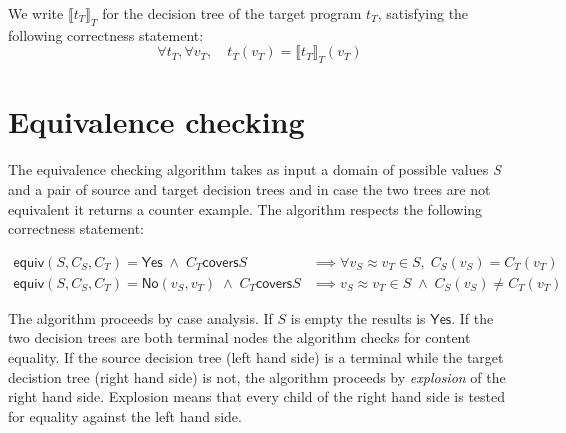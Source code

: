 \documentclass[12pt]{article}
\newcommand{\sem}[1]{{\llbracket{#1}\rrbracket}}
\begin{document}
We write $\sem{t_T}_T$ for the decision tree of the target program
$t_T$, satisfying the following correctness statement:
\[
\forall t_T, \forall v_T, \quad t_T(v_T) = \sem{t_T}_T(v_T)
\]

\section{Equivalence checking}
The equivalence checking algorithm takes as input a domain of
possible values \emph{S} and a pair of source and target decision trees and
in case the two trees are not equivalent it returns a counter example.
The algorithm respects the following correctness statement:

\newcommand{\Equiv}[3]{\mathsf{equiv}(#1, #2, #3)} %

\newcommand{\covers}[2]{#1 \mathrel{\mathsf{covers}} #2}

\newcommand{\Yes}{\mathsf{Yes}}
\newcommand{\No}[2]{\mathsf{No}(#1, #2)}


\begin{align*}
 \Equiv S {C_S} {C_T} = \Yes \;\land\; \covers {C_T} S
 & \implies
 \forall v_S \approx v_T \in S,\; C_S(v_S) = C_T(v_T)
\\
 \Equiv S {C_S} {C_T} = \No {v_S} {v_T} \;\land\; \covers {C_T} S
 & \implies
 v_S \approx v_T \in S \;\land\; C_S(v_S) \neq C_T(v_T)
\end{align*}


The algorithm proceeds by case analysis.
If $S$ is empty the results is $\Yes$.
If the two decision trees are both terminal nodes the algorithm checks
for content equality.
If the source decision tree (left hand side) is a terminal while the
target decistion tree (right hand side) is not, the algorithm proceeds
by \emph{explosion} of the right hand side. Explosion means that every
child of the right hand side is tested for equality against the left
hand side.

\end{document}
